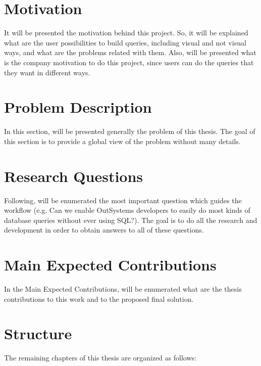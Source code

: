 \section{Motivation}
\label{sec:motivation}
It will be presented the motivation behind this project. So, it will be explained 
what are the user possibilities to build queries, including visual and not 
visual ways, and what are the problems related with them. Also, will be 
presented what is the company motivation to do this project, since users can do 
the queries that they want in different ways.

\section{Problem Description}
\label{sec:problem_description}
In this section, will be presented generally the problem of this thesis. The goal 
of this section is to provide a global view of the problem without many details.

\section{Research Questions}
\label{sec:research_questions}
Following, will be enumerated the most important question which guides the workflow
(e.g. Can we enable OutSystems developers to easily do most kinds of database 
queries without ever using SQL?). The goal is to do all the research and 
development in order to obtain answers to all of these questions.

\section{Main Expected Contributions}
\label{sec:main_exp_contributions}
In the Main Expected Contributions, will be enumerated what are the thesis 
contributions to this work and to the proposed final solution.

\section{Structure}
\label{sec:structure}

The remaining chapters of this thesis are organized as follows:

